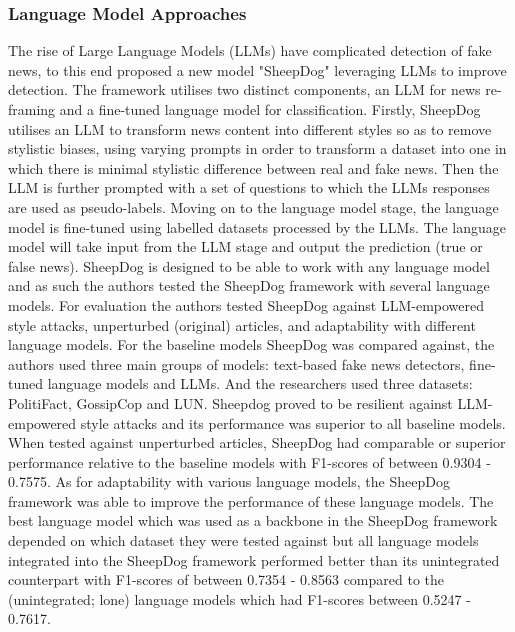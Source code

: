 \documentclass[stu,12pt,floatsintext,donotrepeattitle]{apa7}
\begin{document}
\subsubsection{Language Model Approaches}
The rise of Large Language Models (LLMs) have complicated detection of fake news, to this end \parencite{sheepdog} proposed a new model "SheepDog" leveraging LLMs to improve detection. The framework utilises two distinct components, an LLM for news re-framing and a fine-tuned language model for classification. Firstly, SheepDog utilises an LLM to transform news content into different styles so as to remove stylistic biases, using varying prompts in order to transform a dataset into one in which there is minimal stylistic difference between real and fake news. Then the LLM is further prompted with a set of questions to which the LLMs responses are used as pseudo-labels. Moving on to the language model stage, the language model is fine-tuned using labelled datasets processed by the LLMs. The language model will take input from the LLM stage and output the prediction (true or false news). SheepDog is designed to be able to work with any language model and as such the authors tested the SheepDog framework with several language models. For evaluation the authors tested SheepDog against LLM-empowered style attacks, unperturbed (original) articles, and adaptability with different language models. For the baseline models SheepDog was compared against, the authors used three main groups of models: text-based fake news detectors, fine-tuned language models and LLMs. And the researchers used three datasets: PolitiFact, GossipCop and LUN. Sheepdog proved to be resilient against LLM-empowered style attacks and its performance was superior to all baseline models. When tested against unperturbed articles, SheepDog had comparable or superior performance relative to the baseline models with F1-scores of between 0.9304 - 0.7575. As for adaptability with various language models, the SheepDog framework was able to improve the performance of these language models. The best language model which was used as a backbone in the SheepDog framework depended on which dataset they were tested against but all language models integrated into the SheepDog framework performed better than its unintegrated counterpart with F1-scores of between 0.7354 - 0.8563 compared to the (unintegrated; lone) language models which had F1-scores between 0.5247 - 0.7617. 
\end{document}
